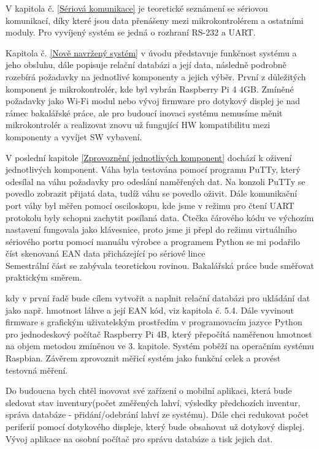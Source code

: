 V kapitola č. \ref{Sériová komunikace} je teoretické seznámení se sériovou komunikací, díky které jsou data přenášeny mezi mikrokontrolérem a ostatními moduly. Pro vyvíjený systém se jedná o rozhraní RS-232 a UART.

Kapitola č. \ref{Nově navržený systém} v úvodu představuje funkčnost systému a jeho obsluhu, dále popisuje relační databázi a její data, následně podrobně rozebírá požadavky na jednotlivé komponenty a jejich výběr. První z důležitých komponent je mikrokontrolér, kde byl vybrán Raspberry Pi 4 4GB. Zmíněné požadavky jako Wi-Fi modul nebo vývoj firmware pro dotykový displej je nad rámec bakalářské práce, ale pro budoucí inovaci systému nemusíme měnit mikrokontrolér a realizovat znovu už fungující HW kompatibilitu mezi komponenty a vyvíjet SW vybavení.

V poslední kapitole \ref{Zprovoznění jednotlivých komponent} dochází k oživení jednotlivých komponent. Váha byla testována pomocí programu PuTTy, který odesílal na váhu požadavky pro odeslání naměřených dat. Na konzoli PuTTy se povedlo zobrazit přijatá data, tudíž váhu se povedlo oživit. Dále komunikační port váhy byl měřen pomocí osciloskopu, kde jsme v režimu pro čtení UART protokolu byly schopni zachytit posílaná data. Čtečka čárového kódu ve výchozím nastavení fungovala jako klávesnice, proto jsme ji přepl do režimu virtuálního sériového portu pomocí manuálu výrobce a programem Python se mi podařilo číst skenovaná EAN data přicházející po sériové lince\\
Semestrální část se zabývala teoretickou rovinou. Bakalářská práce bude směřovat praktickým směrem. 

kdy v první řadě bude cílem vytvořit a naplnit relační databázi pro ukládání dat jako např. hmotnost láhve a její EAN kód, viz kapitola č. 5.4. Dále vyvinout firmware s grafickým uživatelským prostředím v programovacím jazyce Python pro jednodeskový počítač Raspberry Pi 4B, který přepočítá naměřenou hmotnost na objem metodou zmíněnou ve 3. kapitole. Systém poběží na operačním systému Raspbian. Závěrem zprovoznit měřicí systém jako funkční celek a provést testovná měření. 

Do budoucna bych chtěl inovovat své zařízení o mobilní aplikaci, která bude sledovat stav inventury(počet změřených lahví, výsledky předchozích inventur, správa databáze - přidání/odebrání lahví ze systému). Dále chci redukovat počet periferií pomocí dotykového displeje, který bude obsahovat už dotykový displej. Vývoj aplikace na osobní počítač pro správu databáze a tisk jejich dat. %

